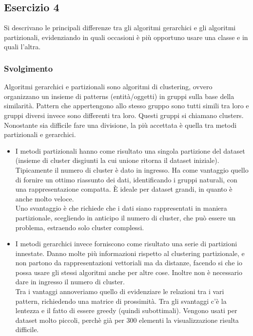 \documentclass{article}
\begin{document}
\subsection*{Esercizio 4}
Si descrivano le principali differenze tra gli algoritmi gerarchici e gli algoritmi partizionali,
evidenziando in quali occasioni è più opportuno usare una classe e in quali l'altra.
\subsubsection*{Svolgimento}
Algoritmi gerarchici e partizionali sono algoritmi di clustering, ovvero organizzano un insieme di patterns (entità/oggetti) in gruppi sulla base della similarità. Pattern che appertengono allo stesso gruppo sono tutti simili tra loro e gruppi diversi invece sono differenti tra loro. Questi gruppi si chiamano clusters.\\
Nonostante sia difficile fare una divisione, la più accettata è quella tra metodi partizionali e gerarchici.
\begin{itemize}
    \item I metodi partizionali hanno come risultato una singola partizione del dataset (insieme di cluster disgiunti la cui unione ritorna il dataset iniziale). 
    Tipicamente il numero di cluster è dato in ingresso. Ha come vantaggio quello di fornire un ottimo riassunto dei dati, identificando i gruppi naturali, con una rappresentazione compatta. È ideale per dataset grandi, in quanto è anche molto veloce.\\ Uno svantaggio è che richiede che i dati siano rappresentati in maniera partizionale, scegliendo in anticipo il numero di cluster, che può essere un problema, estraendo solo cluster complessi.
    \item I metodi gerarchici invece forniscono come risultato una serie di partizioni innestate. Danno molte più informazioni rispetto al clustering partizionale, e non partono da rappresentazioni vettoriali ma da distanze, facendo si che io possa usare gli stessi algoritmi anche per altre cose. Inoltre non è necessario dare in ingresso il numero di cluster.\\Tra i vantaggi annoveriamo quello di evidenziare le relazioni tra i vari pattern, richiedendo una matrice di prossimità. Tra gli svantaggi c'è la lentezza e il fatto di essere greedy (quindi subottimali). Vengono usati per dataset molto piccoli, perchè già per 300 elementi la visualizzazione risulta difficile.
\end{itemize}
\end{document}
